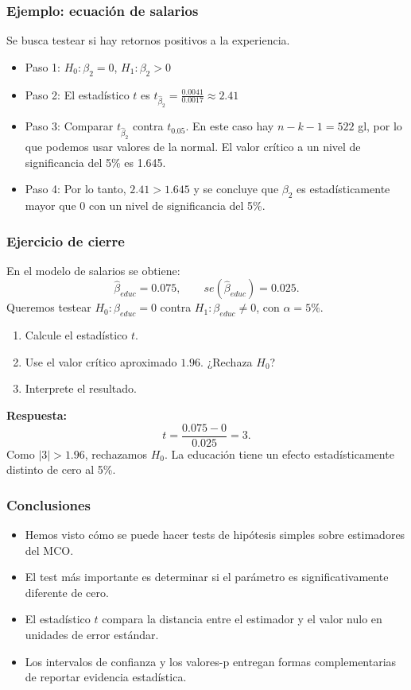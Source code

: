 \documentclass{beamer}
\begin{document}
\begin{frame}
\frametitle{Ejemplo: ecuación de salarios}
Se busca testear si hay retornos positivos a la experiencia.

\begin{itemize}
    \item Paso 1: $H_0: \beta_2 =0$, $H_1: \beta_2 > 0$
    \item Paso 2: El estadístico $t$ es $t_{\hat{\beta}_2} = \frac{0.0041}{0.0017} \approx 2.41$
    \item Paso 3: Comparar $t_{\hat{\beta}_2}$ contra $t_{0.05}$. En este caso hay $n - k - 1 = 522$ gl, por lo que podemos usar valores de  la normal. El valor crítico a un nivel de significancia del 5\% es 1.645.
    \item Paso 4: Por lo tanto, $2.41 > 1.645$ y se concluye que $\beta_2$ es estadísticamente mayor que 0 con un nivel de significancia del 5\%.
\end{itemize}
\end{frame}

\begin{frame}
\frametitle{Ejercicio de cierre}

En el modelo de salarios se obtiene:
\[
\hat{\beta}_{educ}=0.075, \qquad se(\hat{\beta}_{educ})=0.025.
\]
Queremos testear \(H_0:\beta_{educ}=0\) contra \(H_1:\beta_{educ}\neq 0\), con \(\alpha=5\%\).

\begin{enumerate}
    \item Calcule el estadístico \(t\).
    \item Use el valor crítico aproximado \(1.96\). ¿Rechaza \(H_0\)?
    \item Interprete el resultado.
\end{enumerate}

\vspace{0.2cm}
\textbf{Respuesta:}
\[
t=\frac{0.075-0}{0.025}=3.
\]
Como \(|3|>1.96\), rechazamos \(H_0\). La educación tiene un efecto estadísticamente distinto de cero al 5\%.

\end{frame}

\begin{frame}
\frametitle{Conclusiones}
\begin{itemize}
    \item Hemos visto cómo se puede hacer tests de hipótesis simples sobre estimadores del MCO.
    \item El test más importante es determinar si el parámetro es significativamente diferente de cero.
    \item El estadístico \(t\) compara la distancia entre el estimador y el valor nulo en unidades de error estándar.
    \item Los intervalos de confianza y los valores-p entregan formas complementarias de reportar evidencia estadística.
   
\end{itemize}
\end{frame}
\end{document}
